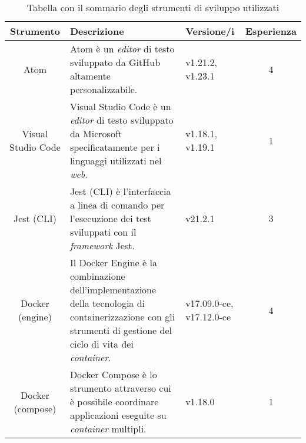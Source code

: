 \begin{table}[H]
\caption{Tabella con il sommario degli strumenti di sviluppo utilizzati}
\label{tab:strumenti}
\begin{tabularx}{\linewidth}{|c|X|X|c|}
\hline
\textbf{Strumento} & \textbf{Descrizione} & \textbf{Versione/i} & \textbf{Esperienza} \\
\hline
Atom & Atom è un \emph{editor} di testo sviluppato da \gls{GitHub} altamente personalizzabile. & v1.21.2, v1.23.1 & 4 \\
\hline
Visual Studio Code & Visual Studio Code è un \emph{editor} di testo sviluppato da \gls{Microsoft} specificatamente per i linguaggi utilizzati nel \emph{web}. & v1.18.1, v1.19.1 & 1 \\
\hline
Jest (\gls{CLI}) & Jest (CLI) è l'interfaccia a linea di comando per l'esecuzione dei test sviluppati con il \emph{framework} Jest. & v21.2.1 & 3 \\
\hline
Docker (engine) & Il Docker Engine è la combinazione dell'implementazione della tecnologia di containerizzazione con gli strumenti di gestione del ciclo di vita dei \emph{container}. & v17.09.0-ce, \newline v17.12.0-ce & 4 \\
\hline
Docker (compose) & Docker Compose è lo strumento attraverso cui è possibile coordinare applicazioni eseguite su \emph{container} multipli. & v1.18.0 & 1 \\
\hline
\end{tabularx}
\end{table}

